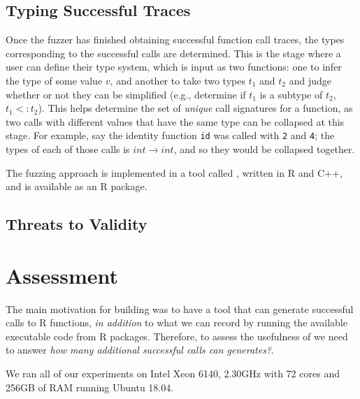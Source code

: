 \documentclass[sigplan,anonymous,review]{acmart}
\begin{document}


\subsection{Typing Successful Traces}

Once the fuzzer has finished obtaining successful function call traces, the types corresponding to the successful calls are determined.
This is the stage where a user can define their type system, which is input as two functions: one to infer the type of some value $v$, and another to take two types $t_1$ and $t_2$ and judge whether or not they can be simplified (e.g., determine if $t_1$ is a subtype of $t_2$, $t_1 <: t_2$).
This helps determine the set of \textit{unique} call signatures for a function, as two calls with different values that have the same type can be collapsed at this stage.
For example, say the identity function {\tt id} was called with {\tt 2} and {\tt 4}; the types of each of those calls is $int \rightarrow int$, and so they would be collapsed together. 

The fuzzing approach is implemented in a tool called \tool, written in R and C++, and is available as an R package.

\subsection{Threats to Validity}



\section{Assessment}
\label{sec:assessment}

The main motivation for building \tool was to have a tool that can generate successful calls to R functions, \emph{in addition} to what we can record by running the available executable code from R packages.
Therefore, to assess the usefulness of \tool we need to answer \emph{how many additional successful calls can \tool generates?}.

We ran all of our experiments on Intel Xeon 6140, 2.30GHz with 72 cores and 256GB of RAM running Ubuntu 18.04.
\end{document}
